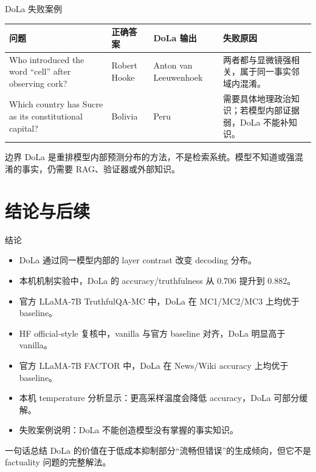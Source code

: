 \documentclass[aspectratio=169,11pt]{ctexbeamer}
\begin{document}
\begin{frame}{DoLa 失败案例}
  \small
  \begin{tabularx}{\textwidth}{>{\raggedright\arraybackslash}p{}
    >{\raggedright\arraybackslash}p{}
    >{\raggedright\arraybackslash}p{}
    >{\raggedright\arraybackslash}X}
    \toprule
    问题 & 正确答案 & DoLa 输出 & 失败原因 \\
    \midrule
    Who introduced the word ``cell'' after observing cork? & Robert Hooke & Anton van Leeuwenhoek & 两者都与显微镜强相关，属于同一事实邻域内混淆。 \\
    Which country has Sucre as its constitutional capital? & Bolivia & Peru & 需要具体地理政治知识；若模型内部证据弱，DoLa 不能补知识。 \\
    \bottomrule
  \end{tabularx}

  \vspace{0.6em}
  \begin{alertblock}{边界}
    DoLa 是重排模型内部预测分布的方法，不是检索系统。模型不知道或强混淆的事实，仍需要 RAG、验证器或外部知识。
  \end{alertblock}
\end{frame}

\section{结论与后续}

\begin{frame}{结论}
  \begin{itemize}
    \item DoLa 通过同一模型内部的 layer contrast 改变 decoding 分布。
    \item 本机机制实验中，DoLa 的 accuracy/truthfulness 从 0.706 提升到 0.882。
    \item 官方 LLaMA-7B TruthfulQA-MC 中，DoLa 在 MC1/MC2/MC3 上均优于 baseline。
    \item HF official-style 复核中，vanilla 与官方 baseline 对齐，DoLa 明显高于 vanilla。
    \item 官方 LLaMA-7B FACTOR 中，DoLa 在 News/Wiki accuracy 上均优于 baseline。
    \item 本机 temperature 分析显示：更高采样温度会降低 accuracy，DoLa 可部分缓解。
    \item 失败案例说明：DoLa 不能创造模型没有掌握的事实知识。
  \end{itemize}

  \vspace{0.5em}
  \begin{block}{一句话总结}
    DoLa 的价值在于低成本抑制部分“流畅但错误”的生成倾向，但它不是 factuality 问题的完整解法。
  \end{block}
\end{frame}
\end{document}
